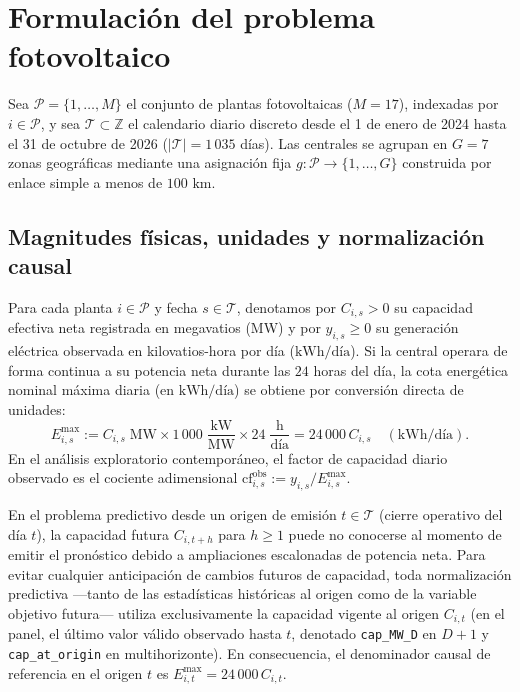 \section{Formulación del problema fotovoltaico}\label{sec:problema}

Sea $\mathcal{P} = \{1,\dots,M\}$ el conjunto de plantas fotovoltaicas ($M=17$), indexadas por $i \in \mathcal{P}$, y sea $\mathcal{T} \subset \mathbb{Z}$ el calendario diario discreto desde el 1 de enero de 2024 hasta el 31 de octubre de 2026 ($|\mathcal{T}| = 1\,035$ días). Las centrales se agrupan en $G=7$ zonas geográficas mediante una asignación fija $g : \mathcal{P} \to \{1,\dots,G\}$ construida por enlace simple a menos de $100\text{ km}$.

\subsection{Magnitudes físicas, unidades y normalización causal}

Para cada planta $i \in \mathcal{P}$ y fecha $s \in \mathcal{T}$, denotamos por $C_{i,s} > 0$ su capacidad efectiva neta registrada en megavatios (MW) y por $y_{i,s} \ge 0$ su generación eléctrica observada en kilovatios-hora por día ($\text{kWh/día}$). Si la central operara de forma continua a su potencia neta durante las $24$ horas del día, la cota energética nominal máxima diaria (en $\text{kWh/día}$) se obtiene por conversión directa de unidades:
\begin{equation}
E^{\max}_{i,s} := C_{i,s}\;\text{MW} \times 1\,000\;\frac{\text{kW}}{\text{MW}} \times 24\;\frac{\text{h}}{\text{día}} = 24\,000\,C_{i,s} \quad (\text{kWh/día}).
\label{eq:emax}
\end{equation}
En el análisis exploratorio contemporáneo, el factor de capacidad diario observado es el cociente adimensional $\mathrm{cf}^{\mathrm{obs}}_{i,s} := y_{i,s} / E^{\max}_{i,s}$.

En el problema predictivo desde un origen de emisión $t \in \mathcal{T}$ (cierre operativo del día $t$), la capacidad futura $C_{i,t+h}$ para $h \ge 1$ puede no conocerse al momento de emitir el pronóstico debido a ampliaciones escalonadas de potencia neta. Para evitar cualquier anticipación de cambios futuros de capacidad, toda normalización predictiva ---tanto de las estadísticas históricas al origen como de la variable objetivo futura--- utiliza exclusivamente la capacidad vigente al origen $C_{i,t}$ (en el panel, el último valor válido observado hasta $t$, denotado \texttt{cap\_MW\_D} en $D+1$ y \texttt{cap\_at\_origin} en multihorizonte). En consecuencia, el denominador causal de referencia en el origen $t$ es $E^{\max}_{i,t} = 24\,000\,C_{i,t}$.

